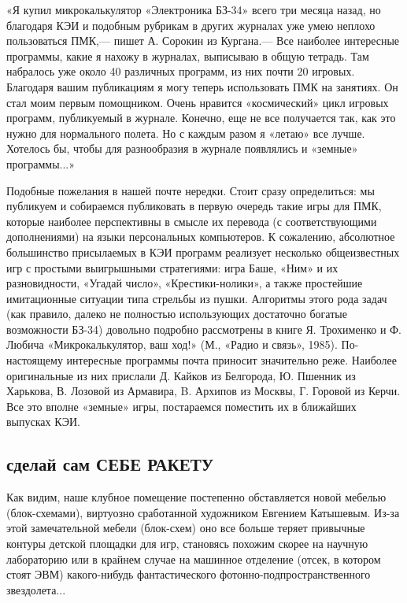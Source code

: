 \documentclass[11pt,a4paper,oneside]{article}
\begin{document}
«Я купил микрокалькулятор «Электроника БЗ-34» всего три месяца назад, но благодаря КЭИ и подобным рубрикам в других журналах уже умею неплохо пользоваться ПМК,— пишет А.	Сорокин из Кургана.— Все наиболее интересные программы, какие я нахожу в журналах, выписываю в общую тетрадь. Там набралось уже около 40 различных программ, из них почти 20 игровых. Благодаря вашим публикациям я могу теперь использовать ПМК на занятиях. Он стал моим первым помощником. Очень нравится «космический» цикл игровых программ, публикуемый в журнале. Конечно, еще не все получается так, как это нужно для нормального полета. Но с каждым разом я «летаю» все лучше. Хотелось бы, чтобы для разнообразия в журнале появлялись и «земные» программы...»

Подобные пожелания в нашей почте нередки. Стоит сразу определиться: мы публикуем и собираемся публиковать в первую очередь такие игры для ПМК, которые наиболее перспективны в смысле их перевода (с соответствующими дополнениями) на языки персональных компьютеров. К сожалению, абсолютное большинство присылаемых в КЭИ программ реализует несколько общеизвестных игр с простыми выигрышными стратегиями: игра Баше, «Ним» и их разновидности, «Угадай число», «Крестики-нолики», а также простейшие имитационные ситуации типа стрельбы из пушки. Алгоритмы этого рода задач (как правило, далеко не полностью использующих достаточно богатые возможности БЗ-34) довольно подробно рассмотрены в книге Я. Трохименко и Ф. Любича «Микрокалькулятор, ваш ход!» (М., «Радио и связь», 1985). По-настоящему интересные программы почта приносит значительно реже. Наиболее оригинальные из них прислали Д. Кайков из Белгорода, Ю. Пшенник из Харькова, В. Лозовой из Армавира,
B. 	Архипов из Москвы, Г. Горовой из Керчи. Все это вполне «земные» игры, постараемся поместить их в ближайших выпусках КЭИ.

\subsection{сделай сам СЕБЕ РАКЕТУ}
Как видим, наше клубное помещение постепенно обставляется новой мебелью (блок-схемами), виртуозно сработанной художником Евгением Катышевым. Из-за этой замечательной мебели (блок-схем) оно все больше теряет привычные контуры детской площадки для игр, становясь похожим скорее на научную лабораторию или в крайнем случае на машинное отделение (отсек, в котором стоят ЭВМ) какого-нибудь фантастического фотонно-подпространственного звездолета...
\end{document}
